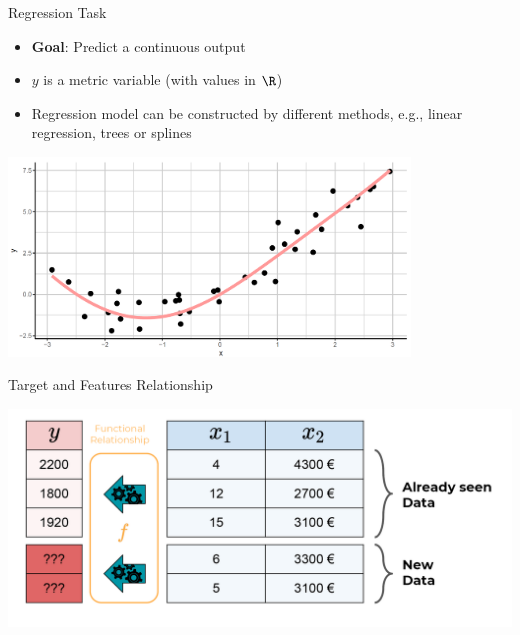 \begin{frame}{Regression Task}

\begin{itemize}
\item
  \textbf{Goal}: Predict a continuous output
\item
  \(y\) is a metric variable (with values in \(\R\))
\item
  Regression model can be constructed by different methods, e.g., linear
  regression, trees or splines
\end{itemize}

\begin{center}
\includegraphics[width=0.8\textwidth]{plots/Reg-task.png}
\end{center}


\end{frame}


\begin{frame}{Target and Features Relationship}

\scriptsize

\begin{center}\includegraphics[width=\textwidth]{plots/what_is_a_model_web} \end{center}

\normalsize 

\end{frame}

